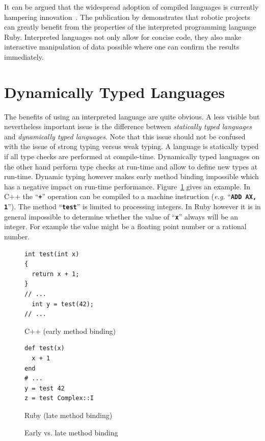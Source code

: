 \documentclass[12pt,a4paper,oneside,openright]{book}
\newcommand{\eg}{\emph{e.g.} }
\newcommand{\Eg}{For ex\-am\-ple }
\newcommand{\fig}[1]{Figure~\ref{fig:#1}}
\newcommand{\code}[1]{``\texttt{\textbf{\textcolor{codegray}{\small{#1}}}}''}
\begin{document}
\begin{CJK}{UTF8}{}
It can be argued that the widespread adoption of compiled languages is currently hampering innovation~\citep{RefWorks:311}. The publication by \citet{RefWorks:480} demonstrates that robotic projects can greatly benefit from the properties of the interpreted programming language Ruby. Interpreted languages not only allow for concise code, they also make interactive manipulation of data possible where one can confirm the results immediately.

\section{Dynamically Typed Languages}\label{cha:dyntyped}
The benefits of using an interpreted language are quite obvious. A less visible but nevertheless important issue is the difference between \emph{statically typed languages} and \emph{dynamically typed languages}. Note that this issue should not be confused with the issue of strong typing versus weak typing. A language is statically typed if all type checks are performed at compile-time. Dynamically typed languages on the other hand perform type checks at run-time and allow to define new types at run-time. Dynamic typing however makes early method binding impossible which has a negative impact on run-time performance. \fig{binding} gives an example. In C++ the \code{+} operation can be compiled to a machine instruction (\eg \code{ADD AX, 1}). The method \code{test} is limited to processing integers. In Ruby however it is in general impossible to determine whether the value of \code{x} always will be an integer. \Eg the value might be a floating point number or a rational number.
\begin{figure}[htbp]
  \begin{center}
    \begin{minipage}[b]{.4\textwidth}
      \begin{center}
        \lstset{language=C++,frame=single,numbers=none}
        \begin{lstlisting}
int test(int x)
{
  return x + 1;
}
// ...
  int y = test(42);
// ...
        \end{lstlisting}
        C++ (early method binding)
      \end{center}
    \end{minipage}\hspace{3ex}
    \begin{minipage}[b]{.4\textwidth}
      \begin{center}
        \lstset{language=Ruby,frame=single,numbers=none}
        \begin{lstlisting}
def test(x)
  x + 1
end
# ...
y = test 42
z = test Complex::I
        \end{lstlisting}
        Ruby (late method binding)
      \end{center}
    \end{minipage}
  \end{center}
  \caption{Early vs. late method binding\label{fig:binding}}
\end{figure}


\end{CJK}
\end{document}

